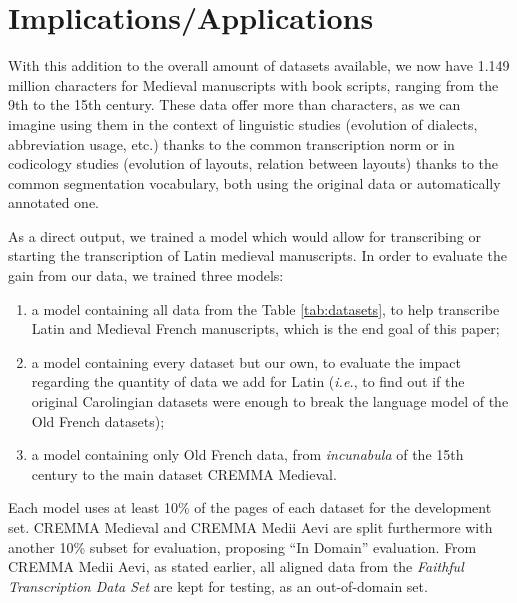 \documentclass{article}
\begin{document}
\section{Implications/Applications}

With this addition to the overall amount of datasets available, we now have 1.149 million characters for Medieval manuscripts with book scripts, ranging from the 9th to the 15th century. These data offer more than characters, as we can imagine using them in the context of linguistic studies (evolution of dialects, abbreviation usage, etc.) thanks to the common transcription norm or in codicology studies (evolution of layouts, relation between layouts) thanks to the common segmentation vocabulary, both using the original data or automatically annotated one.

As a direct output, we trained a model which would allow for transcribing or starting the transcription of Latin medieval manuscripts. In order to evaluate the gain from our data, we trained three models:
\begin{enumerate}
    \item a model containing all data from the Table \ref{tab:datasets}, to help transcribe Latin and Medieval French manuscripts, which is the end goal of this paper;
    \item a model containing every dataset but our own, to evaluate the impact regarding the quantity of data we add for Latin (\textit{i.e.}, to find out if the original Carolingian datasets were enough to break the language model of the Old French datasets);
    \item a model containing only Old French data, from \textit{incunabula} of the 15th century to the main dataset CREMMA Medieval.
\end{enumerate}
Each model uses at least 10\% of the pages of each dataset for the development set. CREMMA Medieval and CREMMA Medii Aevi are split furthermore with another 10\% subset for evaluation, proposing \enquote{In Domain} evaluation. From CREMMA Medii Aevi, as stated earlier, all aligned data from the \textit{Faithful Transcription Data Set} are kept for testing, as an out-of-domain set.
\end{document}
